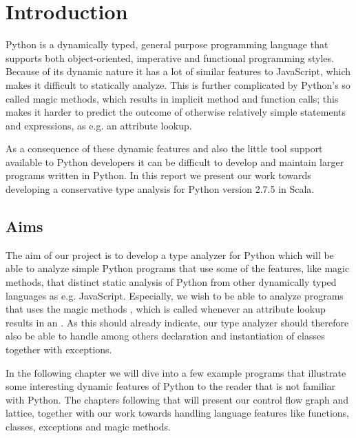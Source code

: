 \chapter{Introduction}
Python is a dynamically typed, general purpose programming language that supports both object-oriented, imperative and functional programming styles. Because of its dynamic nature it has a lot of similar features to JavaScript, which makes it difficult to statically analyze. This is further complicated by Python's so called magic methods, which results in implicit method and function calls; this makes it harder to predict the outcome of otherwise relatively simple statements and expressions, as e.g. an attribute lookup.

As a consequence of these dynamic features and also the little tool support available to Python developers it can be difficult to develop and maintain larger programs written in Python. In this report we present our work towards developing a conservative type analysis for Python version 2.7.5 in Scala.

\section{Aims}
The aim of our project is to develop a type analyzer for Python which will be able to analyze simple Python programs that use some of the features, like magic methods, that distinct static analysis of Python from other dynamically typed languages as e.g. JavaScript. Especially, we wish to be able to analyze programs that uses the magic methods , which is called whenever an attribute lookup results in an . As this should already indicate, our type analyzer should therefore also be able to handle among others declaration and instantiation of classes together with exceptions.

In the following chapter we will dive into a few example programs that illustrate some interesting dynamic features of Python to the reader that is not familiar with Python. The chapters following that will present our control flow graph and lattice, together with our work towards handling language features like functions, classes, exceptions and magic methods.
